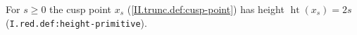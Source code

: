 For $s\ge0$ the cusp point $x_s$ (\cref{II.trunc.def:cusp-point}) has height $\operatorname{ht}(x_s)=2s$ (\texttt{I.red.def:height-primitive}).
